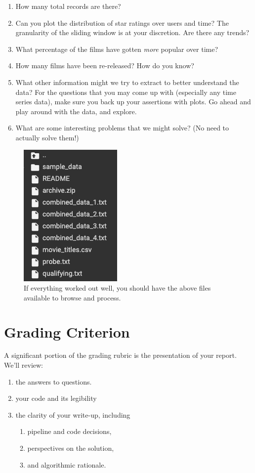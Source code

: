 \documentclass[paper=a4, fontsize=11pt]{scrartcl} %
\begin{document}
\begin{enumerate}
    \item How many total records are there?
    \item Can you plot the distribution of star ratings over users and time? The granularity of the sliding window is at your discretion. Are there any trends?
    \item What percentage of the films have gotten \emph{more} popular over time?
    \item How many films have been re-released? How do you know?
    \item What other information might we try to extract to better understand the data? For the questions that you may come up with (especially any time series data), make sure you back up your assertions with plots. Go ahead and play around with the data, and explore. 
    \item What are some interesting problems that we might solve? (No need to actually solve them!)
\end{enumerate}

\begin{figure}
    \centering
    \includegraphics{images/hw1q2.png}
    \caption{If everything worked out well, you should have the above files available to browse and process.}
    \label{fig:data-files}
\end{figure}

\section{Grading Criterion}

A significant portion of the grading rubric is the presentation of your report. We'll review:

\begin{enumerate}
    \item the answers to questions.
    \item your code and its legibility
    \item the clarity of your write-up, including 
    \begin{enumerate}
      \item pipeline and code decisions, 
      \item perspectives on the solution, 
      \item and algorithmic rationale.
    \end{enumerate}
\end{enumerate}
\end{document}
